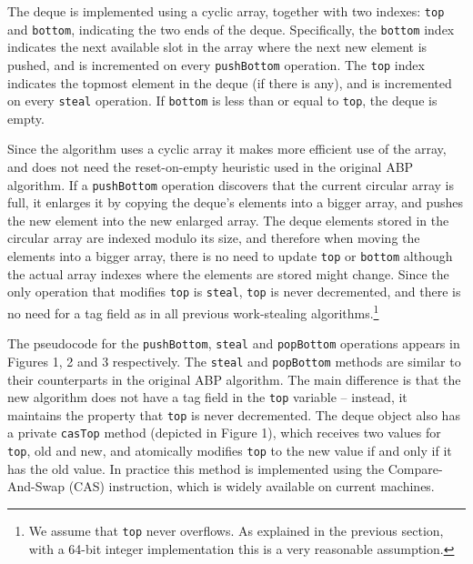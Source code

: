 The deque is implemented using a cyclic array, together with two
indexes: \lstinline!top! and \lstinline!bottom!, indicating the two
ends of the deque. Specifically, the \lstinline!bottom! index
indicates the next available slot in the array where the next new
element is pushed, and is incremented on every \lstinline!pushBottom!
operation. The \lstinline!top! index indicates the topmost element in
the deque (if there is any), and is incremented on every
\lstinline!steal! operation. If \lstinline!bottom! is less than or
equal to \lstinline!top!, the deque is empty.

Since the algorithm uses a cyclic array it makes more efficient use of
the array, and does not need the reset-on-empty heuristic used in the
original ABP algorithm. If a \lstinline!pushBottom! operation
discovers that the current circular array is full, it enlarges it by
copying the deque's elements into a bigger array, and pushes the new
element into the new enlarged array. The deque elements stored in the
circular array are indexed modulo its size, and therefore when moving
the elements into a bigger array, there is no need to update
\lstinline!top! or \lstinline!bottom! although the actual array
indexes where the elements are stored might change. Since the only
operation that modifies \lstinline!top! is \lstinline!steal!,
\lstinline!top! is never decremented, and there is no need for a tag
field as in all previous work-stealing algorithms.\footnote{We assume
  that \lstinline!top! never overflows. As explained in the previous
  section, with a 64-bit integer implementation this is a very
  reasonable assumption.}


The pseudocode for the \lstinline!pushBottom!, \lstinline!steal! and
\lstinline!popBottom! operations appears in Figures 1, 2 and 3
respectively. The \lstinline!steal! and \lstinline!popBottom! methods
are similar to their counterparts in the original ABP algorithm. The
main difference is that the new algorithm does not have a tag field in
the \lstinline!top! variable -- instead, it maintains the property
that \lstinline!top! is never decremented. The deque object also has a
private \lstinline!casTop! method (depicted in Figure 1), which
receives two values for \lstinline!top!, old and new, and atomically
modifies \lstinline!top! to the new value if and only if it has the
old value. In practice this method is implemented using the
Compare-And-Swap (CAS) instruction, which is widely available on
current machines.

